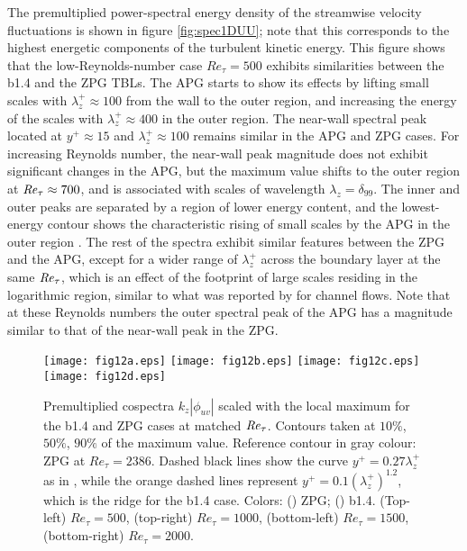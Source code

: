 The premultiplied power-spectral energy density of the streamwise velocity fluctuations is shown in figure \ref{fig:spec1DUU}; note that this corresponds to the highest energetic components of the turbulent kinetic energy.
This figure shows that the low-Reynolds-number case $Re_{\tau}=500$ exhibits similarities between the b1.4 and the ZPG TBLs. The APG starts to show its effects by lifting small scales with $\lambda_z^+ \approx 100$ from the wall to the outer region, and increasing the energy of the scales with $\lambda_z^+ \approx 400$ in the outer region. The near-wall spectral peak located at $y^+\approx 15$ and $\lambda_z^+ \approx 100$ remains similar in the APG and ZPG cases.
For increasing Reynolds number, the near-wall peak magnitude does not exhibit significant changes in the APG, but the maximum value shifts to the outer region at $\mbox{\textit{Re}}_{\tau} \approx 700$, and is associated with scales of wavelength $\lambda_z=\delta_{99}$.
The inner and outer peaks are separated by a region of lower energy content, and the lowest-energy contour shows the characteristic rising of small scales by the APG in the outer region \citep{tanarro_2020, VINUESA2018}. The rest of the spectra exhibit similar features between the ZPG and the APG, except for a wider range of $\lambda_z^+$ across the boundary layer at the same $\mbox{\textit{Re}}_{\tau}$, which is an effect of the footprint of large scales residing in the logarithmic region, similar to what was reported by \cite{Hoyas_PoF2006} for channel flows.
Note that at these Reynolds numbers the outer spectral peak of the APG has a magnitude similar to that of the near-wall peak in the ZPG.

\begin{figure}
\texttt{[image: fig12a.eps]}
\texttt{[image: fig12b.eps]}
\texttt{[image: fig12c.eps]}
\texttt{[image: fig12d.eps]}
  \caption{ Premultiplied cospectra $k_z |\phi_{uv}|$ scaled with the local maximum for the b1.4 and ZPG cases at matched $\mbox{\textit{Re}}_{\tau}$. Contours taken at $10\%$, $50\%$, $90\%$ of the maximum value. Reference contour in gray colour: ZPG at $Re_{\tau}=2386$. Dashed black lines show the curve $y^+=0.27 \lambda_z^+$ as in \cite{giovanetti2016}, while the orange dashed lines represent $y^+=0.1 (\lambda_z^+)^{1.2}$, which is the ridge for the b1.4 case. Colors: (\protect\blackline) ZPG; (\protect\orangeline) b1.4. (Top-left) $Re_{\tau}=500$, (top-right) $Re_{\tau}=1000$, (bottom-left) $Re_{\tau}=1500$, (bottom-right) $Re_{\tau}=2000$.}
\label{fig:spec1DUV}
\end{figure}

